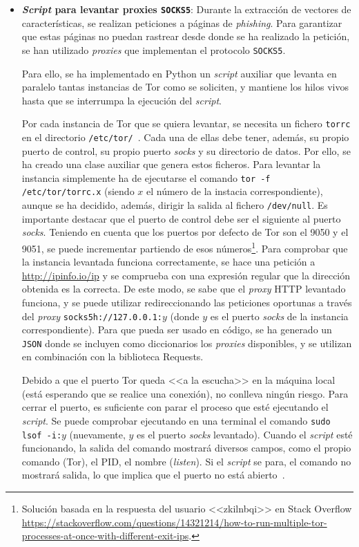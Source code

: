 \begin{itemize}
	\item \textbf{\textit{Script} para levantar proxies \texttt{SOCKS5}}:
	\label{sec:script_tor}
Durante la extracción de vectores de características, se realizan peticiones a páginas de \textit{phishing}. Para garantizar que estas páginas no puedan rastrear desde donde se ha realizado la petición, se han utilizado \textit{proxies} que implementan el protocolo \texttt{SOCKS5}.

Para ello, se ha implementado en Python un \textit{script} auxiliar que levanta en paralelo tantas instancias de Tor como se soliciten, y mantiene los hilos vivos hasta que se interrumpa la ejecución del \textit{script}.

Por cada instancia de Tor que se quiera levantar, se necesita un fichero \texttt{torrc} en el directorio \texttt{/etc/tor/}~\cite{TorFicherosTor}. Cada una de ellas debe tener, además, su propio puerto de control, su propio puerto \textit{socks} y su directorio de datos. Por ello, se ha creado una clase auxiliar que genera estos ficheros. Para levantar la instancia simplemente ha de ejecutarse el comando \texttt{tor -f /etc/tor/torrc.x} (siendo $x$ el número de la instacia correspondiente), aunque se ha decidido, además, dirigir la salida al fichero \texttt{/dev/null}. Es importante destacar que el puerto de control debe ser el siguiente al puerto \textit{socks}. Teniendo en cuenta que los puertos por defecto de Tor son el 9050 y el 9051, se puede incrementar partiendo de esos números\footnote{Solución basada en la respuesta del usuario <<zkilnbqi>> en Stack Overflow \url{https://stackoverflow.com/questions/14321214/how-to-run-multiple-tor-processes-at-once-with-different-exit-ips}.}. Para comprobar que la instancia levantada funciona correctamente, se hace una petición a \url{http://ipinfo.io/ip} y se comprueba con una expresión regular que la dirección obtenida es la correcta. De este modo, se sabe que el \textit{proxy} HTTP levantado funciona, y se puede utilizar redireccionando las peticiones oportunas a través del \textit{proxy} \texttt{socks5h://127.0.0.1:$y$} (donde $y$ es el puerto \textit{socks} de la instancia correspondiente). Para que pueda ser usado en código, se ha generado un \texttt{JSON} donde se incluyen como diccionarios los \textit{proxies} disponibles, y se utilizan en combinación con la biblioteca Requests.

Debido a que el puerto Tor queda <<a la escucha>> en la máquina local (está esperando que se realice una conexión), no conlleva ningún riesgo. Para cerrar el puerto, es suficiente con parar el proceso que esté ejecutando el \textit{script}. Se puede comprobar ejecutando en una terminal el comando \texttt{sudo lsof -i:$y$} (nuevamente, $y$ es el puerto \textit{socks} levantado). Cuando el \textit{script} esté funcionando, la salida del comando mostrará diversos campos, como el propio comando (Tor), el PID, el nombre (\textit{listen}). Si el \textit{script} se para, el comando no mostrará salida, lo que implica que el puerto no está abierto~\cite{checkOpenTorPorts}.


\end{itemize}
